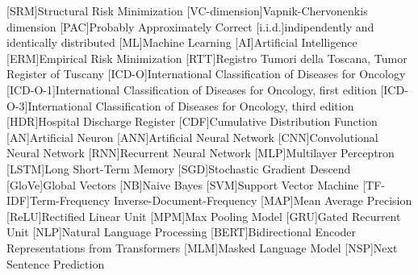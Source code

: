 

\newcommand{\svm}{\textbf{\emph{T-SVM}}}
\newcommand{\svmb}{\textbf{\emph{T2-SVM}}}
\newcommand{\lstmng}{\textbf{\emph{T2-2LSTM}}}
\newcommand{\lstmc}{\textbf{\emph{G-CLSTM}}}
\newcommand{\lstmb}{\textbf{\emph{G-2LSTM}}}

\newcommand{\site}{Main-site}
\newcommand{\fullSite}{Full-site}
\newcommand{\type}{Type}
\newcommand{\behaviour}{Behavior}

\newcommand{\matr}[1]{\bm{#1}}
\newcommand{\vect}[1]{\bm{#1}}
\newcommand{\dist}[1]{\mathcal{#1}}

\newtheorem{definition}{Definition}[section]
\newtheorem{lemma}[definition]{Lemma}
\newtheorem{corollary}[definition]{Corollary}
\newtheorem{theorem}[definition]{Theorem}

\def\RSet{\mathbb{R}}
\def\NSet{\mathbb{N}}
\def\XSet{\mathbb{X}}
\def\YSet{\mathbb{Y}}
\def\HSet{\mathbb{H}}
\def\prob{\mathbb{P}}
\def\expect{\mathbb{E}}
\def\define{\overset{\underset{\mathrm{def}}{}}{=}}

\DeclareMathOperator*{\argmax}{arg\,max}
\DeclareMathOperator*{\argmin}{arg\,min}

\def\MAX{MPM}
\def\loss{\mathcal{L}}

\def\maxi{MPMi}
\def\maxb{MPMb}
\def\softmax{SPM}

[SRM]{Structural Risk Minimization}
[VC-dimension]{Vapnik-Chervonenkis dimension}
[PAC]{Probably Approximately Correct}
[i.i.d.]{indipendently and identically distributed}
[ML]{Machine Learning}
[AI]{Artificial Intelligence}
[ERM]{Empirical Risk Minimization}
[RTT]{Registro Tumori della Toscana, Tumor Register of Tuscany}
[ICD-O]{International Classification of Diseases for Oncology}
[ICD-O-1]{International Classification of Diseases for Oncology, first edition}
[ICD-O-3]{International Classification of Diseases for Oncology, third edition}
[HDR]{Hospital Discharge Register}
[CDF]{Cumulative Distribution Function}
[AN]{Artificial Neuron}
[ANN]{Artificial Neural Network}
[CNN]{Convolutional Neural Network}
[RNN]{Recurrent Neural Network}
[MLP]{Multilayer Perceptron}
[LSTM]{Long Short-Term Memory}
[SGD]{Stochastic Gradient Descend}
[GloVe]{Global Vectors}
[NB]{Naive Bayes}
[SVM]{Support Vector Machine}
[TF-IDF]{Term-Frequency Inverse-Document-Frequency}
[MAP]{Mean Average Precision}
[ReLU]{Rectified Linear Unit}
[MPM]{Max Pooling Model}
[GRU]{Gated Recurrent Unit}
[NLP]{Natural Language Processing}
[BERT]{Bidirectional Encoder Representations from Transformers}
[MLM]{Masked Language Model}
[NSP]{Next Sentence Prediction}

